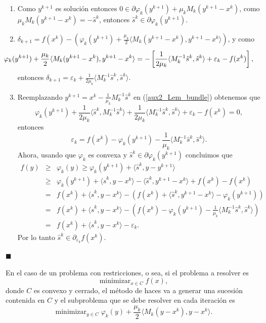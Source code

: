 \documentclass[a4paper,12pt]{report}
\newcommand{\la}{\langle}
\newcommand{\ra}{\rangle}
\newcommand{\vep}{\varepsilon}
\newcommand{\vfi}{\varphi}
\newenvironment{dem}{\vspace*{-0.1cm}{\it Demostraci\'on:}}{\hfill
$\blacksquare$\\}
\begin{document}
\begin{dem}
\begin{enumerate}
\item Como $y^{k+1}$ es soluci\'on entonces $0\in\partial \vfi_k(y^{k+1})+\mu_k M_k(y^{k+1}-x^k)$, como $\mu_k M_k(y^{k+1}-x^k)=-\hat{s}^k$, entonces $\hat{s}^k\in\partial\vfi_k(y^{k+1})$.
\item $\delta_{k+1}=f(x^k)-\left(\vfi_k(y^{k+1})+\frac{\mu_k}{2}\la M_k(y^{k+1}-x^k),y^{k+1}-x^k\ra\right)$, y como
\begin{equation}\label{aux2_Lem_bundle}
\hspace{-1cm}\vfi_k(y^{k+1})+\frac{\mu_k}{2}\la M_k(y^{k+1}-x^k),y^{k+1}-x^k\ra=-\left[ \frac{1}{2\mu_k}\la M_k^{-1}\hat{s}^k,\hat{s}^k\ra +\vep_k-f(x^k)\right], 
\end{equation}
entonces $\delta_{k+1}=\vep_{k}+\frac{1}{2\mu_k}\la M_k^{-1}\hat{s}^k,\hat{s}^k\ra$.
\item Reemplazando $y^{k+1}=x^k-\frac{1}{\mu_k}M_k^{-1}\hat{s}^k$ en (\ref{aux2_Lem_bundle}) obtenemos que 
$$\vfi_k(y^{k+1})+\frac{1}{2\mu_k}\la \hat{s}^k,M_k^{-1}\hat{s}^k\ra+\frac{1}{2\mu_k}\la M_k^{-1}\hat{s}^k,\hat{s}^k\ra +\vep_k - f(x^k)=0,$$
entonces
$$\vep_k=f(x^k)-\vfi_k(y^{k+1})-\frac{1}{\mu_k}\la M_k^{-1}\hat{s}^k,\hat{s}^k\ra.$$
Ahora, usando que $\vfi_k$ es convexa y $\hat{s}^k\in\partial\vfi_k(y^{k+1})$ concluimos que
\begin{eqnarray*}
f(y)&\geq&\vfi_k(y)\geq\vfi_k(y^{k+1})+\la \hat{s}^k,y-y^{k+1}\ra\\
&\geq&\vfi_k(y^{k+1})+\la \hat{s}^k,y-x^k\ra-\la \hat{s}^k,y^{k+1}-x^k\ra +f(x^k)-f(x^k)\\
&=&f(x^k)+\la \hat{s}^k,y-x^k\ra-\left(f(x^k)+\la \hat{s}^k,y^{k+1}-x^k\ra - \vfi_k(y^{k+1})\right)\\
&=&f(x^k)+\la\hat{s}^k,y-x^k \ra-\left(f(x^k)-\vfi_k(y^{k+1})-\frac{1}{\mu_k}\la M_k^{-1} \hat{s}^k,\hat{s}^k\ra\right)\\
&=&f(x^k)+\la\hat{s}^k,y-x^k \ra-\vep_k.
\end{eqnarray*}
Por lo tanto $\hat{s}^k\in\partial_{\vep_k} f(x^k)$.
\end{enumerate}
\end{dem}


En el caso de un problema con restricciones, o sea, si el problema a resolver es
\[
 \mathop{\mathrm{minimizar}}_{x\in C} f(x),
\]
donde $C$ es convexo y cerrado, el m\'etodo de haces va a generar una sucesi\'on contenida en $C$ y el subproblema que se debe resolver en cada iteraci\'on es
\begin{equation}
\mathop\mathrm{minimizar}_{y\in C}\vfi_k(y)+\frac{\mu_k}{2}\la M_k(y-x^k),y-x^k\ra.
\end{equation}
\end{document}
